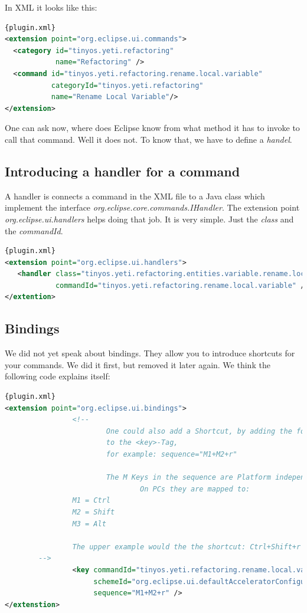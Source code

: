 \documentclass[a4paper,10pt]{report}
\begin{document}
In XML it looks like this:
\begin{lstlisting}[language=XML,caption=Createing a command ({\it plugin.xml})]{plugin.xml}
<extension point="org.eclipse.ui.commands">
  <category id="tinyos.yeti.refactoring"
            name="Refactoring" />
  <command id="tinyos.yeti.refactoring.rename.local.variable"
           categoryId="tinyos.yeti.refactoring"
           name="Rename Local Variable"/>
</extension>
\end{lstlisting}

One can ask now, where does Eclipse know from what method it has to invoke to call that command. Well it does not. To know that, we have to define a {\it handel}.

\subsection{Introducing a handler for a command}
\label{commandHandler}
A handler is connects a command in the XML file to a Java class which implement the interface {\it org.eclipse.core.commands.IHandler}. The extension point
{\it org.eclipse.ui.handlers} helps doing that job. It is very simple. Just the {\it class} and the {\it commandId}.
\begin{lstlisting}[language=XML,caption=Connecting a command to a handler ({\it plugin.xml})]{plugin.xml}
<extension point="org.eclipse.ui.handlers">
   <handler class="tinyos.yeti.refactoring.entities.variable.rename.local.RenameLocalVariableActionHandler"
            commandId="tinyos.yeti.refactoring.rename.local.variable" />
</extention>
\end{lstlisting}

\subsection{Bindings}
We did not yet speak about bindings. They allow you to introduce shortcuts for your commands. We did it first, but removed it later again.
We think the following code explains itself:
\begin{lstlisting}[language=XML,caption=Introduce shortcuts ({\it plugin.xml})]{plugin.xml}
<extension point="org.eclipse.ui.bindings">
                <!--
                        One could also add a Shortcut, by adding the following Attribute
                        to the <key>-Tag,
                        for example: sequence="M1+M2+r"

                        The M Keys in the sequence are Platform independent keys.
                                On PCs they are mapped to:
                M1 = Ctrl
                M2 = Shift
                M3 = Alt

                The upper example would the the shortcut: Ctrl+Shift+r
		-->
                <key commandId="tinyos.yeti.refactoring.rename.local.variable"
                     schemeId="org.eclipse.ui.defaultAcceleratorConfiguration"
                     sequence="M1+M2+r" />
</extenstion>
\end{lstlisting}
\end{document}
